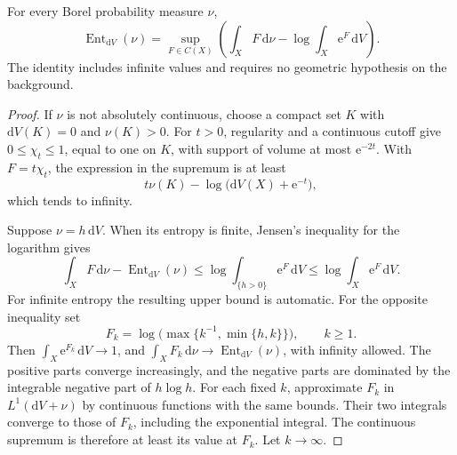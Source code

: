 \begin{lemma}\label{lem:entropy-variational}
For every Borel probability measure $\nu$,
\[
 \operatorname{Ent}_{\mathrm{d}V}(\nu)
 =\sup_{F\in C(X)}\left(\int_XF\,\mathrm{d}\nu
                     -\log\int_X\mathrm{e}^F\,\mathrm{d}V\right).
\]
The identity includes infinite values and requires no geometric hypothesis on the background.
\end{lemma}
\begin{proof}
If $\nu$ is not absolutely continuous, choose a compact set $K$ with $\mathrm{d}V(K)=0$ and $\nu(K)>0$. For $t>0$, regularity and a continuous cutoff give $0\leq\chi_t\leq1$, equal to one on $K$, with support of volume at most $\mathrm{e}^{-2t}$. With $F=t\chi_t$, the expression in the supremum is at least
\[
 t\nu(K)-\log\bigl(\mathrm{d}V(X)+\mathrm{e}^{-t}\bigr),
\]
which tends to infinity.

Suppose $\nu=h\,\mathrm{d}V$. When its entropy is finite, Jensen's inequality for the logarithm gives
\[
 \int_XF\,\mathrm{d}\nu-\operatorname{Ent}_{\mathrm{d}V}(\nu)
 \leq\log\int_{\{h>0\}}\mathrm{e}^F\,\mathrm{d}V
 \leq\log\int_X\mathrm{e}^F\,\mathrm{d}V.
\]
For infinite entropy the resulting upper bound is automatic. For the opposite inequality set
\[
 F_k=\log\bigl(\max\{k^{-1},\min\{h,k\}\}\bigr),\qquad k\geq1.
\]
Then $\int_X\mathrm{e}^{F_k}\,\mathrm{d}V\to1$, and $\int_XF_k\,\mathrm{d}\nu\to\operatorname{Ent}_{\mathrm{d}V}(\nu)$, with infinity allowed. The positive parts converge increasingly, and the negative parts are dominated by the integrable negative part of $h\log h$. For each fixed $k$, approximate $F_k$ in $L^1(\mathrm{d}V+\nu)$ by continuous functions with the same bounds. Their two integrals converge to those of $F_k$, including the exponential integral. The continuous supremum is therefore at least its value at $F_k$. Let $k\to\infty$.
\end{proof}

